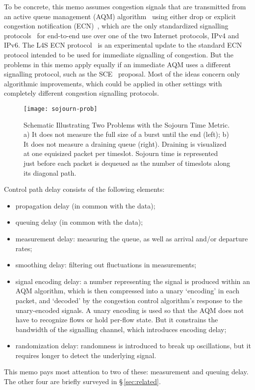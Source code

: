 To be concrete, this memo assumes congestion signals that are transmitted from an active queue management (AQM) algorithm~\cite{Adams13:AQM_survey} using either drop or explicit congestion notification (ECN)~\cite{Floyd94:ECN}, which are the only standardized signalling protocols~\cite{IETF_RFC3168:ECN_IP_TCP} for end-to-end use over one of the two Internet protocols, IPv4 and IPv6. The L4S ECN protocol~\cite{Briscoe15f:ecn-l4s-id_ID} is an experimental update to the standard ECN protocol intended to be used for immediate signalling of congestion. But the problems in this memo apply equally if an immediate AQM uses a different signalling protocol, such as the SCE~\cite{Morton19:SCE_ID} proposal. Most of the ideas concern only algorithmic improvements, which could be applied in other settings with completely different congestion signalling protocols.

\begin{figure*}
	\centering
	\texttt{[image: sojourn-prob]}
	\caption{Schematic Illustrating Two Problems with the Sojourn Time Metric. a) It does not measure the full size of a burst until the end (left); b) It does not measure a draining queue (right). Draining is visualized at one equisized packet per timeslot. Sojourn time is represented just before each packet is dequeued as the number of timeslots along its diagonal path.}\label{fig:sojourn-prob}
\end{figure*}

Control path delay consists of the following elements:
\begin{itemize}[nosep]
	\item propagation delay (in common with the data);
	\item queuing delay (in common with the data);
	\item measurement delay: measuring the queue, as well as arrival and/or departure rates;
	\item smoothing delay: filtering out fluctuations in measurements;
	\item signal encoding delay: a number representing the signal is produced within an AQM algorithm, which is then compressed into a unary `encoding' in each packet, and `decoded' by the congestion control algorithm's response to the unary-encoded signals. A unary encoding is used so that the AQM does not have to recognize flows or hold per-flow state. But it constrains the bandwidth of the signalling channel, which introduces encoding delay;
	\item randomization delay: randomness is introduced to break up oscillations, but it requires longer to detect the underlying signal.
\end{itemize}

This memo pays most attention to two of these: measurement and queuing delay. The other four are briefly surveyed in \S\,\ref{sec:related}.
